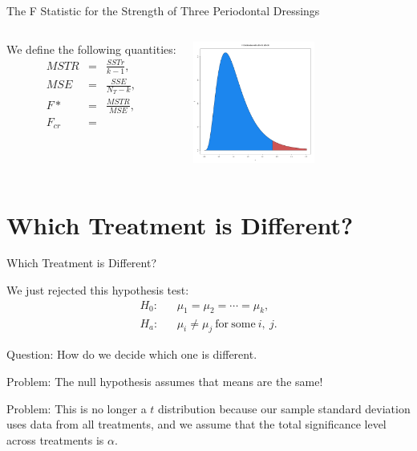 \begin{frame}{The F Statistic for the Strength of Three Periodontal Dressings }

  \begin{columns}

    We define the following quantities:
    \begin{eqnarray*}
      MSTR & = & \frac{SSTr}{k-1}, \\
      MSE  & = & \frac{SSE}{N_T - k}, \\
      F*   & = & \frac{MSTR}{MSE}, \\
      F_{cr} & = &
    \end{eqnarray*}

    \vfill


    \vfill

    \centerline{\includegraphics[width=4cm]{img/FDistribution}}

    \vfill

    \end{columns}

  
\end{frame}


\section{Which Treatment is Different?}

\begin{frame}{Which Treatment is Different?}

We just rejected this hypothesis test:
\begin{eqnarray*}
  H_0: & & \mu_1 = \mu_2 = \cdots = \mu_k, \\
  H_a: & & \mu_i \neq \mu_j ~\mathrm{for~some~}i,~j.
\end{eqnarray*}

\vfill

Question: How do we decide which one is different.

\vfill

Problem: The null hypothesis assumes that  means
are the same!

Problem: This is no longer a $t$ distribution because our sample
standard deviation uses data from all treatments, and we assume that
the total significance level across  treatments
 is $\alpha$.

\vfill
  
  
\end{frame}

